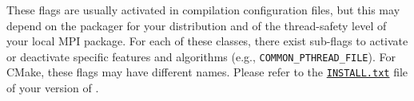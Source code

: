 These flags are usually activated in compilation configuration files,
but this may depend on the packager for your distribution and of the
thread-safety level of your local MPI package. For each of these
classes, there exist sub-flags to activate or deactivate specific
features and algorithms (e.g.,
\texttt{COMMON\_\lbt PTHREAD\_\lbt FILE}). For CMake, these flags may
have different names. Please refer to the
\href{https://gitlab.inria.fr/scotch/scotch/-/blob/master/INSTALL.txt}{\texttt{INSTALL.txt}}
file of your version of \scotch.

\begin{center}
\end{center}
